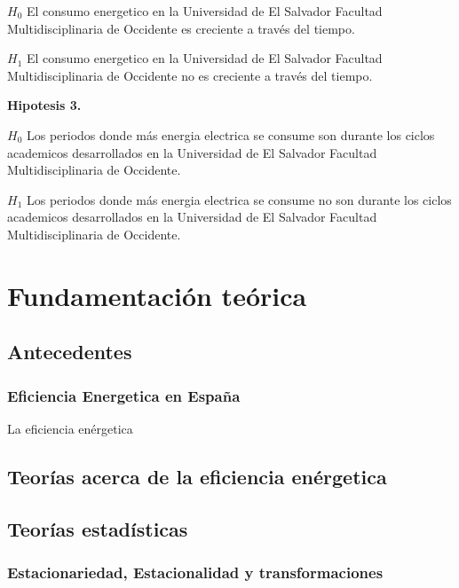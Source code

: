 \documentclass[12pt,letterpaper]{report}
\begin{document}
$H_0$ El consumo energetico en la Universidad de El Salvador Facultad Multidisciplinaria de Occidente es creciente a través del tiempo.

$H_1$ El consumo energetico en la Universidad de El Salvador Facultad Multidisciplinaria de Occidente no es creciente a través del tiempo.


\textbf{ Hipotesis 3.}

$H_0$ Los periodos donde más energia electrica se consume son durante los ciclos academicos desarrollados en la Universidad de El Salvador Facultad Multidisciplinaria de Occidente. 

$H_1$ Los periodos donde más energia electrica se consume no son durante los ciclos academicos desarrollados en la Universidad de El Salvador Facultad Multidisciplinaria de Occidente.





\chapter{Fundamentación teórica}
\section{Antecedentes}
  \subsection{Eficiencia Energetica en España}

    La eficiencia enérgetica 



\section{Teorías acerca de la eficiencia enérgetica}

\section{Teorías estadísticas}

  \subsection{Estacionariedad, Estacionalidad y transformaciones}
\end{document}
